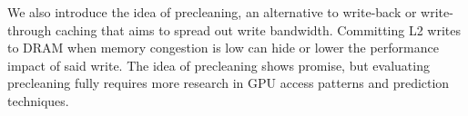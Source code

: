 \documentclass[12pt]{report}	%
\theoremstyle{definition}
\theoremstyle{remark}
\begin{document}
We also introduce the idea of precleaning, an alternative to write-back or write-through caching that aims to spread out write bandwidth. Committing L2 writes to DRAM when memory congestion is low can hide or lower the performance impact of said write. The idea of precleaning shows promise, but evaluating precleaning fully requires more research in GPU access patterns and prediction techniques.

\tableofcontents   %

\listoftables      %
\listoffigures     %



%
%















%
%
%
%
%
%
%
%
%
%
%


%
%
%
%
%
%
%
%
\end{document}
